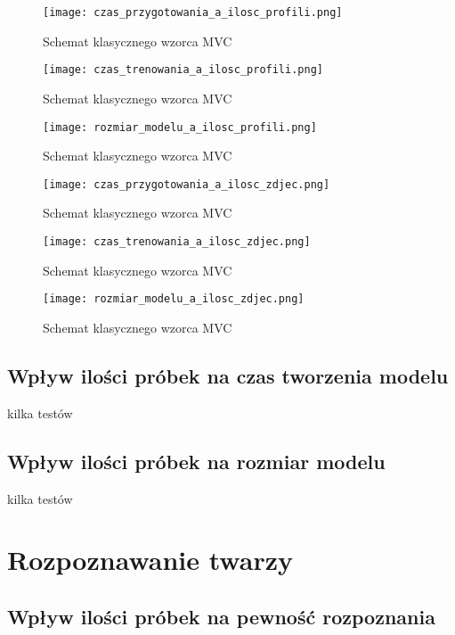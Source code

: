 \begin{figure}[H]
	\centering
	\texttt{[image: czas\_przygotowania\_a\_ilosc\_profili.png]}
	\caption{Schemat klasycznego wzorca MVC}
	\label{fig:schemat_mvc}
\end{figure}

\begin{figure}[H]
	\centering
	\texttt{[image: czas\_trenowania\_a\_ilosc\_profili.png]}
	\caption{Schemat klasycznego wzorca MVC}
	\label{fig:schemat_mvc}
\end{figure}

\begin{figure}[H]
	\centering
	\texttt{[image: rozmiar\_modelu\_a\_ilosc\_profili.png]}
	\caption{Schemat klasycznego wzorca MVC}
	\label{fig:schemat_mvc}
\end{figure}

\begin{figure}[H]
	\centering
	\texttt{[image: czas\_przygotowania\_a\_ilosc\_zdjec.png]}
	\caption{Schemat klasycznego wzorca MVC}
	\label{fig:schemat_mvc}
\end{figure}

\begin{figure}[H]
	\centering
	\texttt{[image: czas\_trenowania\_a\_ilosc\_zdjec.png]}
	\caption{Schemat klasycznego wzorca MVC}
	\label{fig:schemat_mvc}
\end{figure}

\begin{figure}[H]
	\centering
	\texttt{[image: rozmiar\_modelu\_a\_ilosc\_zdjec.png]}
	\caption{Schemat klasycznego wzorca MVC}
	\label{fig:schemat_mvc}
\end{figure}

\subsection{Wpływ ilości próbek na czas tworzenia modelu}
kilka testów
\subsection{Wpływ ilości próbek na rozmiar modelu}
kilka testów

\section{Rozpoznawanie twarzy} \label{b:rozpoznawanie}
\subsection{Wpływ ilości próbek na pewność rozpoznania}

